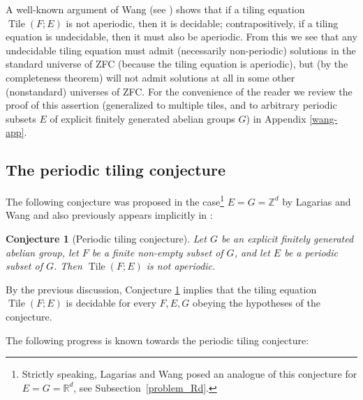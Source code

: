 \documentclass[reqno,a4paper,12pt]{amsart}
\numberwithin{equation}{section}
\numberwithin{figure}{section}
\def\R{\mathbb{R}}
\def\Z{\mathbb{Z}}
\newcommand{\Tile}{\operatorname{Tile}}
\theoremstyle{plain}
\newtheorem{conjecture}[thm]{Conjecture}
\theoremstyle{definition}
\newcommand{\subsecref}[1]{Subsection~\ref{#1}}
\begin{document}
A well-known argument of Wang (see \cite{Ber, R}) shows that if a tiling equation $\Tile(F;E)$ is not aperiodic, then it is decidable; contrapositively, if a tiling equation is undecidable, then it must also be aperiodic.  From this we see that any undecidable tiling equation must admit (necessarily non-periodic) solutions in the standard universe of ZFC (because the tiling equation is aperiodic), but (by the completeness theorem) will not admit solutions at all in some other (nonstandard) universes of ZFC.  For the convenience of the reader we review the proof of this assertion (generalized to multiple tiles, and to arbitrary periodic subsets $E$ of explicit finitely generated abelian groups $G$) in Appendix \ref{wang-app}.

\subsection{The periodic tiling conjecture}\label{subsub-ptc} The following conjecture was proposed in the case\footnote{Strictly speaking, Lagarias and Wang posed an analogue of this conjecture for $E=G=\R^d$, see \subsecref{problem_Rd}.}  $E=G=\Z^d$ by Lagarias and Wang \cite{LW} and also previously appears implicitly in \cite[p. 23]{grunbaum-shephard}:

\begin{conjecture}[Periodic tiling conjecture]\label{ptc}  Let $G$ be an explicit finitely generated abelian group, let $F$ be a finite non-empty subset of $G$, and let $E$ be a periodic subset of $G$.  Then $\Tile(F;E)$ is not aperiodic.
\end{conjecture}

By the previous discussion, Conjecture \ref{ptc} implies that the tiling equation $\Tile(F;E)$ is decidable for every $F,E,G$ obeying the hypotheses of the conjecture.

The following progress is known towards the periodic tiling conjecture:
\end{document}
